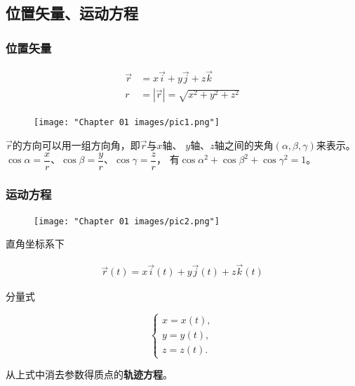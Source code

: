 \documentclass[
	12pt, %
	a4paper, %
]{myLegrandOrangeBook}
\begin{document}
\subsection{位置矢量、运动方程}

\subsubsection*{位置矢量}

    \vspace{1em}
    \begin{definition}[位置矢量]
        \begin{align}
            \overrightarrow{r} &= x\overrightarrow{i} + y\overrightarrow{j} + z\overrightarrow{k} \\
            r &= \left|\overrightarrow{r}\right| = \sqrt{x^2 + y^2 + z^2}
        \end{align}
    \end{definition}

    \begin{figure}
        \centering
        \texttt{[image: "Chapter 01 images/pic1.png"]}
        \label{pic1}
    \end{figure}

    \(\overrightarrow{r}\)的方向可以用一组方向角，即\(\overrightarrow{r}\)与\(x\)轴、
    \(y\)轴、\(z\)轴之间的夹角\(\left(\alpha, \beta, \gamma\right)\)来表示。
    \(\cos \alpha = \dfrac{x}{r}\)、\(\cos \beta = \dfrac{y}{r}\)、\(\cos \gamma = \dfrac{z}{r}\)，
    有\(\cos \alpha ^2 + \cos \beta ^2 + \cos \gamma ^2 = 1\)。

\subsubsection*{运动方程}
    
    \begin{figure}[!htbp]
        \centering
        \texttt{[image: "Chapter 01 images/pic2.png"]}
        \label{pic1-2}
    \end{figure}

    \vspace{1em}
    \begin{definition}[运动方程]
        直角坐标系下

        \begin{align}
            \overrightarrow{r}\left(t\right) = 
            x\overrightarrow{i}\left(t\right) + y\overrightarrow{j}\left(t\right)
            + z\overrightarrow{k}\left(t\right)
        \end{align}

        分量式

        \[
        \begin{cases}
        x = x\left(t\right), \\
        y = y\left(t\right), \\ 
        z = z\left(t\right).
        \end{cases}
        \]

        从上式中消去参数得质点的\textbf{轨迹方程}。
    \end{definition}
\end{document}
